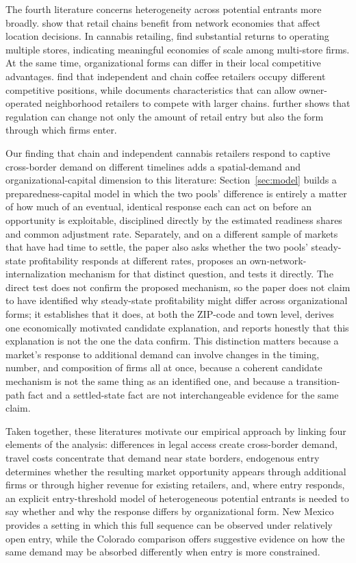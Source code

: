 \documentclass[english,12pt]{article}
\begin{document}
The fourth literature concerns heterogeneity across potential entrants more broadly. \citet{EllicksonHoughtonTimmins2013} show that retail chains benefit from network economies that affect location decisions. In cannabis retailing, \citet{HollenbeckGiroldo2022} find substantial returns to operating multiple stores, indicating meaningful economies of scale among multi-store firms. At the same time, organizational forms can differ in their local competitive advantages. \citet{AdamsEtAl2018} find that independent and chain coffee retailers occupy different competitive positions, while \citet{TalamasMarcos2025} documents characteristics that can allow owner-operated neighborhood retailers to compete with larger chains. \citet{Sadun2015} further shows that regulation can change not only the amount of retail entry but also the form through which firms enter.

Our finding that chain and independent cannabis retailers respond to captive cross-border demand on different timelines adds a spatial-demand and organizational-capital dimension to this literature: Section~\ref{sec:model} builds a preparedness-capital model in which the two pools' difference is entirely a matter of how much of an eventual, identical response each can act on before an opportunity is exploitable, disciplined directly by the estimated readiness shares and common adjustment rate. Separately, and on a different sample of markets that have had time to settle, the paper also asks whether the two pools' steady-state profitability responds at different rates, proposes an own-network-internalization mechanism for that distinct question, and tests it directly. The direct test does not confirm the proposed mechanism, so the paper does not claim to have identified why steady-state profitability might differ across organizational forms; it establishes that it does, at both the ZIP-code and town level, derives one economically motivated candidate explanation, and reports honestly that this explanation is not the one the data confirm. This distinction matters because a market's response to additional demand can involve changes in the timing, number, and composition of firms all at once, because a coherent candidate mechanism is not the same thing as an identified one, and because a transition-path fact and a settled-state fact are not interchangeable evidence for the same claim.

Taken together, these literatures motivate our empirical approach by linking four elements of the analysis: differences in legal access create cross-border demand, travel costs concentrate that demand near state borders, endogenous entry determines whether the resulting market opportunity appears through additional firms or through higher revenue for existing retailers, and, where entry responds, an explicit entry-threshold model of heterogeneous potential entrants is needed to say whether and why the response differs by organizational form. New Mexico provides a setting in which this full sequence can be observed under relatively open entry, while the Colorado comparison offers suggestive evidence on how the same demand may be absorbed differently when entry is more constrained.
\end{document}
